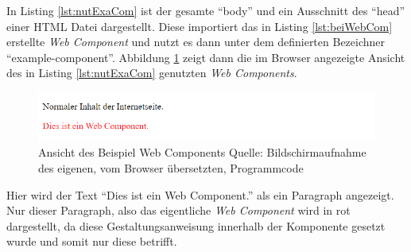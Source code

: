\documentclass[12pt, paper=a4, bibtotoc, toc=listof, headsepline=true, numbers=endperiod]{scrreprt}
\begin{document}
In Listing \ref{lst:nutExaCom} ist der gesamte \enquote{body} und ein Ausschnitt des \enquote{head} einer \ac{HTML} Datei dargestellt. Diese importiert das in Listing \ref{lst:beiWebCom} erstellte \emph{Web Component} und nutzt es dann unter dem definierten Bezeichner \enquote{example-component}. 
Abbildung \ref{img:beiWebCom} zeigt dann die im Browser angezeigte Ansicht des in Listing \ref{lst:nutExaCom} genutzten \emph{Web Components}. 
\begin{figure}[H]				
	\centering
	\includegraphics[width=\textwidth,height=\textheight,keepaspectratio]{beiWebCom.png}
	\caption[Ansicht example-component]{Ansicht des Beispiel Web Components Quelle: Bildschirmaufnahme des eigenen, vom Browser übersetzten, Programmcode}
	\label{img:beiWebCom}
\end{figure}\noindent
Hier wird der Text \enquote{Dies ist ein Web Component.} als ein Paragraph angezeigt. Nur dieser Paragraph, also das eigentliche \emph{Web Component} wird in rot dargestellt, da diese Gestaltungsanweisung innerhalb der Komponente gesetzt wurde und somit nur diese betrifft. 
\end{document}
